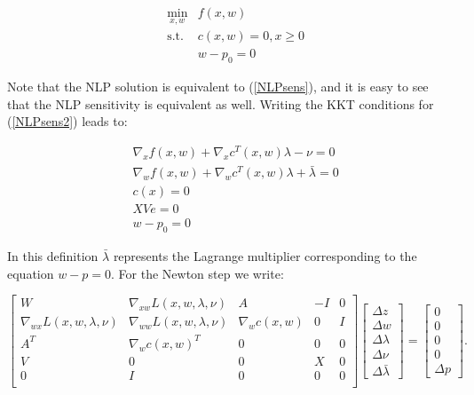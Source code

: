 \documentclass[letter, 11pt]{article}
\begin{document}
\begin{subequations} \label{NLPsens2}
\begin{eqnarray}
&  \min_{x, w} & f(x, w) \\
&  \mbox{s.t.} & c(x, w) = 0, x \geq 0 \\
& & w - p_0 = 0
\end{eqnarray}
\end{subequations}

Note that the NLP solution is equivalent to (\ref{NLPsens}), and
it is easy to see that the NLP sensitivity is equivalent as well.
Writing the KKT conditions for (\ref{NLPsens2}) leads to:

\begin{subequations}\label{eq:reform}
\begin{eqnarray}
& \nabla_x f(x, w) + \nabla_x c^T(x, w)\lambda -\nu = 0\\
& \nabla_w f(x, w) + \nabla_w c^T(x, w)\lambda + \bar{\lambda} = 0\\
& c(x) = 0 \\ & XVe =0 \\ & w - p_0 = 0
\end{eqnarray}
\end{subequations}

In this definition $\bar{\lambda}$ represents the Lagrange multiplier
corresponding to the equation $w - p =0$. For the Newton step we write:

\begin{equation}
  \label{eq:reordered_K_3}
  \left[
  \begin{array}{ccccc}
  W&   \nabla_{xw} L(x, w, \lambda, \nu) & A & -I & 0 \\
  \nabla_{wx} L(x, w, \lambda, \nu) &  \nabla_{ww} L(x, w, \lambda, \nu)
  & \nabla_w c(x, w) & 0 & I \\
      A^T& \nabla_w c(x, w)^T & 0 & 0 & 0 \\
      V &0&0& X & 0 \\
      0 & I &0&0&0\\
  \end{array}
  \right]
  \left[
    \begin{array}{c}
      \Delta z\\ \Delta w \\ \Delta \lambda\\\Delta\nu\\ \Delta\bar{\lambda}
    \end{array}
  \right]
  =
  \left[
   \begin{array}{c}
      0 \\0 \\ 0 \\ 0 \\ \Delta p
   \end{array} \right].
\end{equation}
\end{document}
